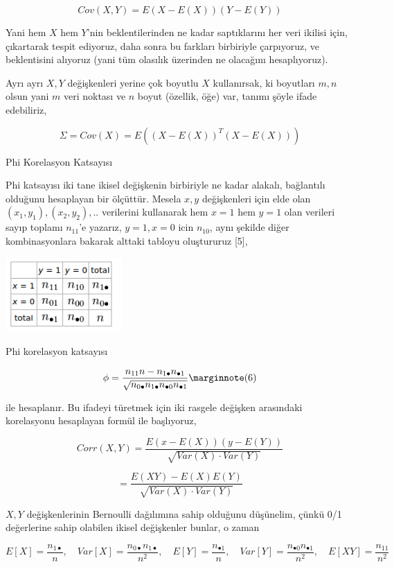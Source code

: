 \documentclass[12pt,fleqn]{article}\usepackage{../../common}
\begin{document}
$$ Cov(X,Y) = E(X-E(X))(Y-E(Y)) $$

Yani hem $X$ hem $Y$'nin beklentilerinden ne kadar saptıklarını her veri
ikilisi için, çıkartarak tespit ediyoruz, daha sonra bu farkları birbiriyle
çarpıyoruz, ve beklentisini alıyoruz (yani tüm olasılık üzerinden ne
olacağını hesaplıyoruz). 

Ayrı ayrı $X,Y$ değişkenleri yerine çok boyutlu $X$ kullanırsak, ki boyutları
$m,n$ olsun yani $m$ veri noktası ve $n$ boyut (özellik, öğe) var, tanımı şöyle
ifade edebiliriz,

$$ \Sigma = Cov(X) = E((X-E(X))^T(X-E(X))) $$

Phi Korelasyon Katsayısı

Phi katsayısı iki tane ikisel değişkenin birbiriyle ne kadar alakalı,
bağlantılı olduğunu hesaplayan bir ölçüttür. Mesela $x,y$ değişkenleri için
elde olan $(x_1,y_1),(x_2,y_2),..$ verilerini kullanarak hem $x=1$ hem
$y=1$ olan verileri sayıp toplamı $n_{11}$'e yazarız, $y=1,x=0$ icin
$n_{10}$, aynı şekilde diğer kombinasyonlara bakarak alttaki tabloyu
oluştururuz [5],

\includegraphics[width=12em]{phitable.png}

Phi korelasyon katsayısı

$$ 
\phi = \frac{n_{11}n - n_{1\bullet}n_{\bullet 1}}
{\sqrt{n_{0\bullet} n_{1\bullet} n_{\bullet 0} n_{\bullet 1}}} 
\mlabel{6}
$$

ile hesaplanır. Bu ifadeyi türetmek için iki rasgele değişken arasındaki
korelasyonu hesaplayan formül ile başlıyoruz,

$$ Corr(X,Y) = \frac{E (x-E(X)) (y-E(Y)) }{\sqrt{Var(X) \cdot Var(Y) } } $$

$$ 
= \frac{E(XY) - E(X)E(Y)}{ \sqrt{Var(X) \cdot Var(Y)} }
$$

$X,Y$ değişkenlerinin Bernoulli dağılımına sahip olduğunu düşünelim, çünkü
0/1 değerlerine sahip olabilen ikisel değişkenler bunlar, o zaman

$$
E[X]= \frac{n_{1\bullet}}{n}, \quad
Var[X]= \frac{n_{0\bullet}n_{1\bullet}}{n^2}, \quad
E[Y]= \frac{n_{\bullet 1}}{n}, \quad
Var[Y]= \frac{n_{\bullet 0}n_{\bullet 1}}{n^2}, \quad
E[XY]= \frac{n_{11}}{n^2}
$$
\end{document}
